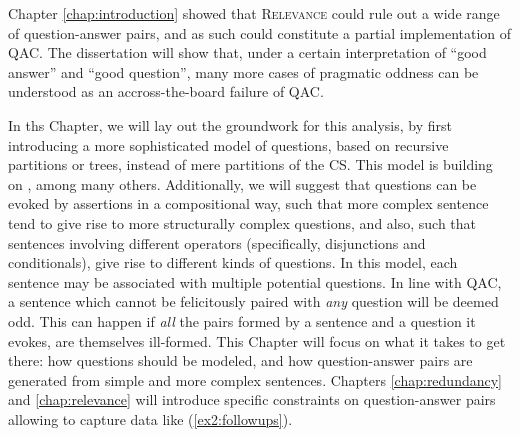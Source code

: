 \begin{exe}
	\label{ex2:q-a-congruence}
\end{exe}

Chapter \ref{chap:introduction} showed that \textsc{Relevance} could rule out a wide range of question-answer pairs, and as such could constitute a partial implementation of QAC. The dissertation will show that, under a certain interpretation of ``good answer'' and ``good question'', many more cases of pragmatic oddness can be understood as an accross-the-board failure of QAC.

In ths Chapter, we will lay out the groundwork for this analysis, by first introducing a more sophisticated model of questions, based on recursive partitions or trees, instead of mere partitions of the CS. This model is building on \citet{Buring2003,Ippolito2019,Zhang2022}, among many others. Additionally, we will suggest that questions can be evoked by assertions in a compositional way, such that more complex sentence tend to give rise to more structurally complex questions, and also, such that sentences involving different operators (specifically, disjunctions and conditionals), give rise to different kinds of questions. In this model, each sentence may be associated with multiple potential questions. In line with QAC, a sentence which cannot be felicitously paired with \textit{any} question will be deemed odd. This can happen if \textit{all} the pairs formed by a sentence and a question it evokes, are themselves ill-formed. This Chapter will focus on what it takes to get there: how questions should be modeled, and how question-answer pairs are generated from simple and more complex sentences. Chapters \ref{chap:redundancy} and \ref{chap:relevance} will introduce specific constraints on question-answer pairs allowing to capture data like (\ref{ex2:followups}).


